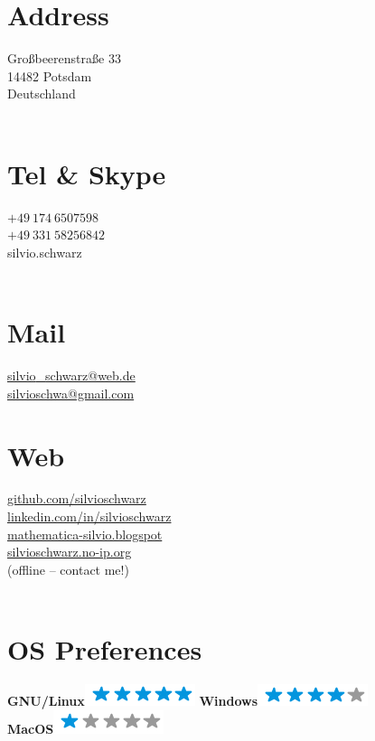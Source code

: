 \documentclass{scrartcl}
\begin{document}
\begin{figure}[htb]
\begin{minipage}[t]{0.25\textwidth}
	\flushright
	\section*{\hfill \color{pblue} Address}
	\vspace{-4mm}
	Großbeerenstraße 33\\
	14482 Potsdam\\
	Deutschland\\
	~
	\section*{\hfill \color{pblue} Tel \& Skype}
	\vspace{-4mm}
	$+49~174~6507598$\\
	$+49~331~58256842$\\
	silvio.schwarz\\
	~
	\section*{\hfill \color{pblue} Mail}
	\vspace{-4mm}
	\href{mailto:silvio\_ schwarz@web.de}{silvio{\_}schwarz@web.de}\\
	\href{mailto:silvioschwa@gmail.com}{silvioschwa@gmail.com}
	~
	\section*{\hfill \color{pblue} Web}
	\vspace{-4mm}
	\href{https://www.github.com/silvioschwarz}{github.com/silvioschwarz} \\
	\href{https://www.linkedin.com/in/silvioschwarz}{linkedin.com/in/silvioschwarz} \\
	\href{http://www.mathematica-silvio.blogspot.de/}{mathematica-silvio.blogspot}\\
	\href{https://www.silvioschwarz.no-ip.org}{silvioschwarz.no-ip.org}\\(offline -- contact me!)\\
~
	\section*{\hfill \color{pblue} OS Preferences}
	\vspace{-2mm}
	\textbf{GNU/Linux}\includegraphics[scale=0.40]{img/5stars.png}
	\textbf{Windows}\includegraphics[scale=0.40]{img/4stars.png}
    \textbf{MacOS}\includegraphics[scale=0.40]{img/1stars.png}\\
~

\end{minipage}
\end{figure}
\end{document}
